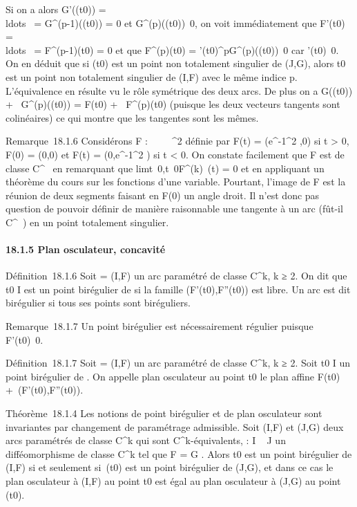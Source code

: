 Si on a alors G'(\theta(t0)) =
\\ldots~ =
G^(p-1)(\theta(t0)) = 0 et
G^(p)(\theta(t0))\neq~0, on voit
immédiatement que F'(t0) =
\\ldots~ =
F^(p-1)(t0) = 0 et que
F^(p)(t0) =
\theta'(t0)^pG^(p)(\theta(t0))\neq~0
car \theta'(t0)\neq~0. On en déduit que si
\theta(t0) est un point non totalement singulier de (J,G), alors
t0 est un point non totalement singulier de (I,F) avec le même
indice p. L'équivalence en résulte vu le rôle symétrique des deux arcs.
De plus on a G(\theta(t0)) + ~G^(p)(\theta(t0)) =
F(t0) + ~F^(p)(t0) (puisque les deux
vecteurs tangents sont colinéaires) ce qui montre que les tangentes sont
les mêmes.

Remarque~18.1.6 Considérons F : ~ \rightarrow~ ~^2 définie par F(t) =
(e^-1\diagupt^2 ,0) si t \textgreater{} 0, F(0) = (0,0)
et F(t) = (0,e^-1\diagupt^2 ) si t \textless{} 0. On
constate facilement que F est de classe C^\infty~ en remarquant que
limt\rightarrow~0,t\neq~0F^(k)~(t)
= 0 et en appliquant un théorème du cours sur les fonctions d'une
variable. Pourtant, l'image de F est la réunion de deux segments faisant
en F(0) un angle droit. Il n'est donc pas question de pouvoir définir de
manière raisonnable une tangente à un arc (fût-il C^\infty~) en un
point totalement singulier.

\paragraph{18.1.5 Plan osculateur, concavité}

Définition~18.1.6 Soit \Gamma = (I,F) un arc paramétré de classe
C^k, k ≥ 2. On dit que t0 \in I est un point
birégulier de \Gamma si la famille (F'(t0),F''(t0)) est
libre. Un arc est dit birégulier si tous ses points sont biréguliers.

Remarque~18.1.7 Un point birégulier est nécessairement régulier puisque
F'(t0)\neq~0.

Définition~18.1.7 Soit \Gamma = (I,F) un arc paramétré de classe
C^k, k ≥ 2. Soit t0 \in I un point birégulier de \Gamma.
On appelle plan osculateur au point t0 le plan affine
F(t0) +\
\mathrmVect(F'(t0),F''(t0)).

Théorème~18.1.4 Les notions de point birégulier et de plan osculateur
sont invariantes par changement de paramétrage admissible. Soit (I,F) et
(J,G) deux arcs paramétrés de classe C^k qui sont
C^k-équivalents, \theta : I \rightarrow~ J un difféomorphisme de classe
C^k tel que F = G \cdot \theta. Alors t0 est un point
birégulier de (I,F) si et seulement si~\theta(t0) est un point
birégulier de (J,G), et dans ce cas le plan osculateur à (I,F) au point
t0 est égal au plan osculateur à (J,G) au point
\theta(t0).

